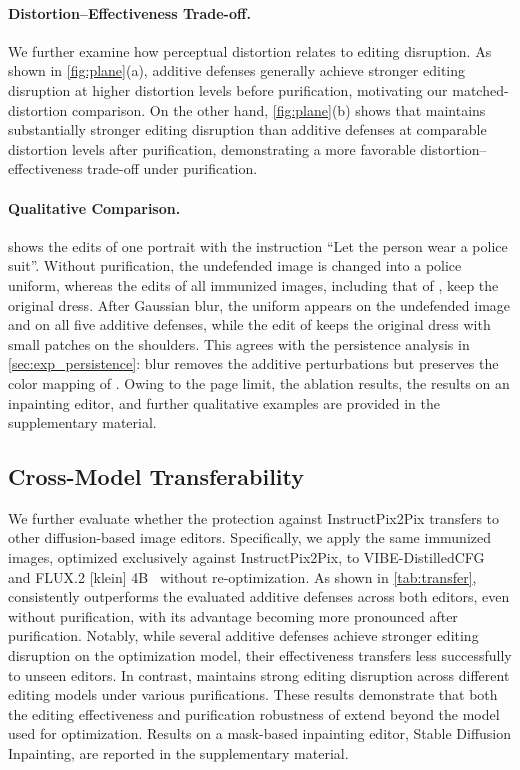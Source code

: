 \paragraph{Distortion–Effectiveness Trade-off.}
We further examine how perceptual distortion relates to editing disruption. As shown in \cref{fig:plane}(a), additive defenses generally achieve stronger editing disruption at higher distortion levels before purification, motivating our matched-distortion comparison. On the other hand, \cref{fig:plane}(b) shows that \capg{} maintains substantially stronger editing disruption than additive defenses at comparable distortion levels after purification, demonstrating a more favorable distortion–effectiveness trade-off under purification.


\paragraph{Qualitative Comparison.}
 shows the edits of one portrait with the instruction ``Let the person wear a police suit''. Without purification, the undefended image is changed into a police uniform, whereas the edits of all immunized images, including that of \capg{}, keep the original dress. After Gaussian blur, the uniform appears on the undefended image and on all five additive defenses, while the edit of \capg{} keeps the original dress with small patches on the shoulders. This agrees with the persistence analysis in \cref{sec:exp_persistence}: blur removes the additive perturbations but preserves the color mapping of \capg{}. Owing to the page limit, the ablation results, the results on an inpainting editor, and further qualitative examples are provided in the supplementary material.


\subsection{Cross-Model Transferability}
We further evaluate whether the protection against InstructPix2Pix transfers to other diffusion-based image editors. Specifically, we apply the same immunized images, optimized exclusively against InstructPix2Pix, to VIBE-DistilledCFG~\cite{alekseenko2026vibe} and FLUX.2 [klein] 4B~\cite{bfl2026flux2klein} without re-optimization. As shown in \cref{tab:transfer}, \capg{} consistently outperforms the evaluated additive defenses across both editors, even without purification, with its advantage becoming more pronounced after purification. Notably, while several additive defenses achieve stronger editing disruption on the optimization model, their effectiveness transfers less successfully to unseen editors. In contrast, \capg{} maintains strong editing disruption across different editing models under various purifications. These results demonstrate that both the editing effectiveness and purification robustness of \capg{} extend beyond the model used for optimization. Results on a mask-based inpainting editor, Stable Diffusion Inpainting, are reported in the supplementary material.



